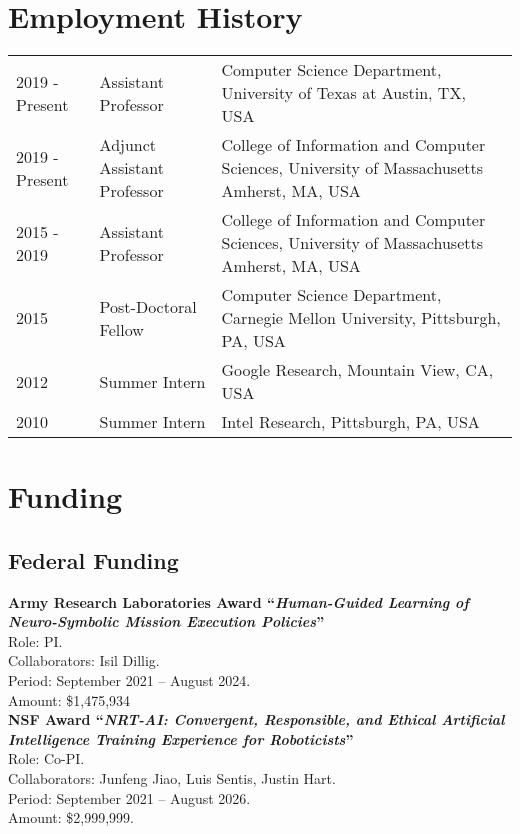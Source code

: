 \documentclass[Times]{article}
\newcommand{\funding}[1]{#1\\}
\begin{document}

\section*{Employment History}
\begin{tabular}{ p{2cm} l p{8cm}}
  2019 - Present & Assistant Professor & Computer Science Department,
  University of Texas at Austin, TX, USA \\
  2019 - Present & Adjunct Assistant Professor &  College of Information and Computer Sciences, University of Massachusetts Amherst, MA, USA\\
  2015 - 2019  & Assistant Professor &  College of Information and Computer Sciences, University of Massachusetts Amherst, MA, USA\\
  2015 & Post-Doctoral Fellow &  Computer Science Department, Carnegie Mellon University, Pittsburgh, PA, USA\\
  2012 & Summer Intern &  Google Research, Mountain View, CA, USA\\
  2010 & Summer Intern &  Intel Research, Pittsburgh, PA, USA\\
\end{tabular}


\section*{Funding}

\subsection*{Federal Funding}

\textbf{Army Research Laboratories Award ``\emph{Human-Guided Learning of Neuro-Symbolic Mission Execution Policies}''}\\
Role: PI.\\
Collaborators: Isil Dillig.\\
Period: September 2021 -- August 2024.\\
\funding{Amount: \$1,475,934}

\textbf{NSF Award ``\emph{NRT-AI: Convergent, Responsible, and Ethical Artificial Intelligence Training Experience for Roboticists}''}\\
Role: Co-PI.\\
Collaborators: Junfeng Jiao, Luis Sentis, Justin Hart.\\
Period: September 2021 -- August 2026.\\
\funding{Amount: \$2,999,999.}
\end{document}
